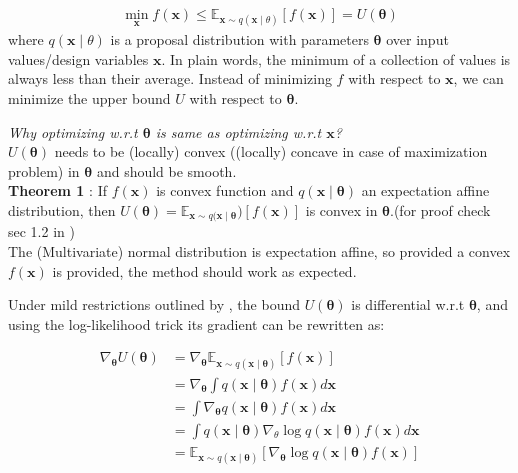 \begin{itemize}
\begin{align}\label{eq:VO_main}
	\min _{\boldsymbol{x}} f(\boldsymbol{x}) \leq \mathbb{E}_{\boldsymbol{x} \sim q(\boldsymbol{x} \mid \theta)}[f(\boldsymbol{x})]=U(\boldsymbol{\theta})
\end{align}
where $q(\boldsymbol{x} \mid \theta)$ is a proposal distribution with parameters $\bm{\theta}$ over input values/design variables $\bm{x}$. In plain words, the minimum of a collection of values is always less than their average. Instead of minimizing $f$ with respect to $\bm{x}$, we can minimize the upper bound $U$ with respect to $\bm{\theta}$.

\begin{mdframed}[backgroundcolor=lightgray, linewidth =0pt]
	\emph{Why optimizing w.r.t $\bm{\theta}$ is same as optimizing w.r.t $\bm{x}$?}\\
	$U(\bm{\theta})$ needs to be (locally) convex ((locally) concave in case of maximization problem) in $\bm{\theta}$ and should be smooth.\\
	\textbf{Theorem 1} : If $f(\boldsymbol{x})$ is convex function and $q(\boldsymbol{x} \mid \bm{\theta})$ an expectation affine distribution, then $U(\bm{\theta}) = \mathbb{E}_{\boldsymbol{x} \sim q(\boldsymbol{x} \mid \bm{\theta}})[f(\boldsymbol{x})]$ is convex in $\bm{\theta}$.(for proof check sec 1.2 in \cite{staines_variational_2012})\\
	The (Multivariate) normal distribution is expectation affine, so provided a convex $f(\boldsymbol{x})$ is provided, the method should work as expected.
	
\end{mdframed}

Under mild restrictions outlined by \cite{staines_variational_2012}, the bound $U(\boldsymbol{ \theta})$ is differential w.r.t $\bm{\theta}$, and using the log-likelihood trick its gradient can be rewritten as:

\begin{align}\label{eq:grad_estimator}
	\nabla_{\boldsymbol{\theta}} U(\boldsymbol{\theta}) &=\nabla_{\boldsymbol{\theta}} \mathbb{E}_{\boldsymbol{x} \sim q(\boldsymbol{x} \mid \boldsymbol{\theta})}[f(\boldsymbol{x})] \nonumber \\
	&=\nabla_{\boldsymbol{\theta}} \int q(\boldsymbol{x} \mid \boldsymbol{\theta}) f(\boldsymbol{x}) d \boldsymbol{x} 
	\nonumber\\
	&=\int \nabla_{\boldsymbol{\theta}} q(\boldsymbol{x} \mid \boldsymbol{\theta}) f(\boldsymbol{x}) d \boldsymbol{x} 
	\nonumber \\
	&=\int q(\boldsymbol{x} \mid \boldsymbol{\theta}) \nabla_\theta \log q(\boldsymbol{x} \mid \boldsymbol{\theta}) f(\boldsymbol{x}) d \boldsymbol{x} 
	\nonumber \\
	&=\mathbb{E}_{\boldsymbol{x} \sim q(\boldsymbol{x} \mid \boldsymbol{\theta})}\left[\nabla_{\boldsymbol{\theta}} \log q(\boldsymbol{x} \mid \boldsymbol{\theta}) f(\boldsymbol{x})\right]
\end{align}


\end{itemize}
